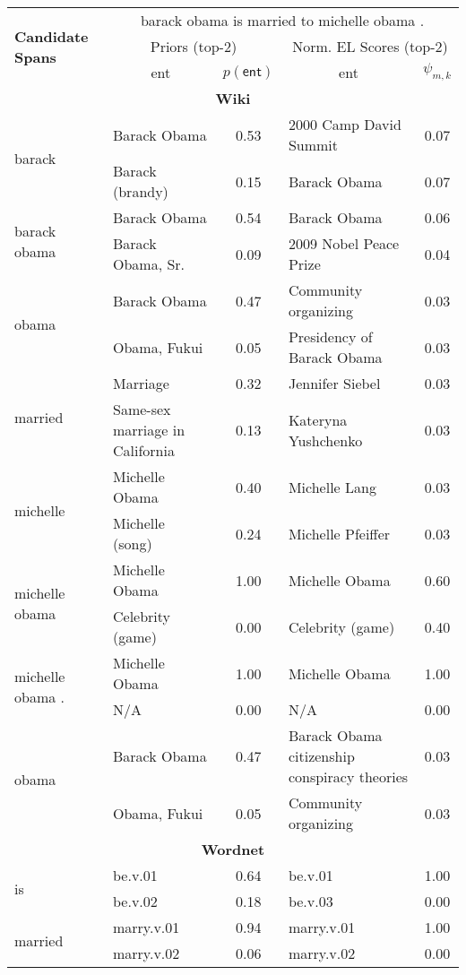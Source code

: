 \begin{table}[t!]
\tiny
\centering
\begin{tabular}{|p{2.4cm}|p{2.8cm}c|p{2.8cm}c|}
\hline
\multirow{3}{*}{\textbf{Candidate Spans}} & \multicolumn{4}{c|}{\textsf{barack obama is married to michelle obama . }} \\
& \multicolumn{2}{c}{Priors (top-2)} & \multicolumn{2}{c|}{Norm. EL Scores (top-2)} \\ \cline{2-5}
& \multicolumn{1}{c|}{\textsf{ent}} & $p(\mathsf{ent})$ & \multicolumn{1}{c|}{\textsf{ent}} & $\psi_{m,k}$ \\ \hline 
\multicolumn{5}{c}{\textbf{\textsf{Wiki}}}\\
\hline
\multirow{2}{*}{\textsf{barack}}& Barack Obama & 0.53 & 2000 Camp David Summit & 0.07\\ 
& Barack (brandy) & 0.15 & Barack Obama & 0.07\\\hline 
\multirow{2}{*}{\textsf{barack obama}}& Barack Obama & 0.54 & Barack Obama & 0.06\\ 
& Barack Obama, Sr. & 0.09 & 2009 Nobel Peace Prize & 0.04\\\hline 
\multirow{2}{*}{\textsf{obama}}& Barack Obama & 0.47 & Community organizing & 0.03\\ 
& Obama, Fukui & 0.05 & Presidency of Barack Obama & 0.03\\\hline 
\multirow{2}{*}{\textsf{married}}& Marriage & 0.32 & Jennifer Siebel & 0.03\\ 
& Same-sex marriage in California & 0.13 & Kateryna Yushchenko & 0.03\\\hline 
\multirow{2}{*}{\textsf{michelle}}& Michelle Obama & 0.40 & Michelle Lang & 0.03\\ 
& Michelle (song) & 0.24 & Michelle Pfeiffer & 0.03\\\hline 
\multirow{2}{*}{\textsf{michelle obama}}& Michelle Obama & 1.00 & Michelle Obama & 0.60\\ 
& Celebrity (game) & 0.00 & Celebrity (game) & 0.40\\\hline 
\multirow{2}{*}{\textsf{michelle obama .}}& Michelle Obama & 1.00 & Michelle Obama & 1.00\\ 
& N/A & 0.00 & N/A & 0.00\\\hline 
\multirow{2}{*}{\textsf{obama}}& Barack Obama & 0.47 & Barack Obama citizenship conspiracy theories & 0.03\\ 
& Obama, Fukui & 0.05 & Community organizing & 0.03\\\hline 
\multicolumn{5}{c}{\textbf{\textsf{Wordnet}}}\\
\hline
\multirow{2}{*}{\textsf{is}}& be.v.01 & 0.64 & be.v.01 & 1.00\\ 
& be.v.02 & 0.18 & be.v.03 & 0.00\\\hline 
\multirow{2}{*}{\textsf{married}}& marry.v.01 & 0.94 & marry.v.01 & 1.00\\ 
& marry.v.02 & 0.06 & marry.v.02 & 0.00\\\hline 
\end{tabular}
\end{table}